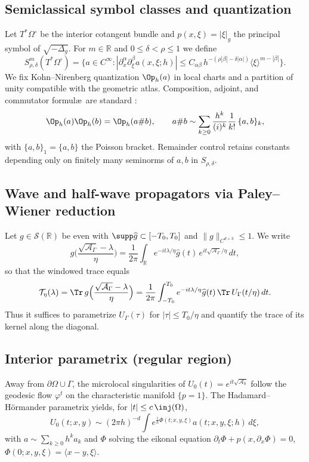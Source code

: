 \subsection{Semiclassical symbol classes and quantization}
\label{sec:symbol-classes}
Let $T^*\Omega^\circ$ be the interior cotangent bundle and $p(x,\xi)=|\xi|_g$ the principal symbol of $\sqrt{-\Delta_g}$.
For $m\in\mathbb{R}$ and $0\le \delta<\rho\le 1$ we define
\[
S^m_{\rho,\delta}(T^*\Omega^\circ) = \Big\{ a\in C^\infty : 
|\partial_x^\alpha\partial_\xi^\beta a(x,\xi;h)|
\le C_{\alpha\beta}\, h^{-(\rho|\beta|-\delta|\alpha|)} \langle \xi\rangle^{m-|\beta|}\Big\}.
\]
We fix Kohn--Nirenberg quantization $\Op_h(a)$ in local charts and a partition of unity compatible with the geometric atlas.
Composition, adjoint, and commutator formul\ae\ are standard \cite{DimassiSjostrand,Zworski}:
\[
\Op_h(a)\Op_h(b)=\Op_h(a\# b),\qquad 
a\# b \sim \sum_{k\ge 0} \frac{h^k}{(i)^k}\frac{1}{k!}\,\{a,b\}_k,
\]
with $\{a,b\}_1=\{a,b\}$ the Poisson bracket. Remainder control retains constants depending only on finitely many seminorms of $a,b$ in $S_{\rho,\delta}$.

\subsection{Wave and half-wave propagators via Paley--Wiener reduction}
Let $g\in \mathcal{S}(\mathbb{R})$ be even with $\supp\widehat{g}\subset[-T_0,T_0]$ and $\|g\|_{C^{d+3}}\le 1$.
We write
\[
g\Big(\frac{\sqrt{\mathcal{A}_\Gamma}-\lambda}{\eta}\Big)
= \frac{1}{2\pi}\int_{\mathbb{R}} e^{-it\lambda/\eta}\widehat{g}(t)\, e^{it \sqrt{\mathcal{A}_\Gamma}/\eta}\,dt,
\]
so that the windowed trace equals
\[
\mathcal{T}_\eta(\lambda)= \Tr \,g\Big(\frac{\sqrt{\mathcal{A}_\Gamma}-\lambda}{\eta}\Big)
= \frac{1}{2\pi}\int_{-T_0}^{T_0} e^{-it\lambda/\eta}\widehat{g}(t)\,\Tr\, U_\Gamma(t/\eta)\,dt.
\]
Thus it suffices to parametrize $U_\Gamma(\tau)$ for $|\tau|\le T_0/\eta$ and quantify the trace of its kernel along the diagonal.

\subsection{Interior parametrix (regular region)}
\label{subsec:interior-parametrix}
Away from $\partial\Omega\cup\Gamma$, the microlocal singularities of $U_0(t)=e^{it\sqrt{\mathcal{A}_0}}$ follow the geodesic flow $\varphi^t$ on the characteristic manifold $\{p=1\}$. The Hadamard--Hörmander parametrix \cite{Hormander,Zworski} yields, for $|t|\le c\,\inj(\Omega)$,
\[
U_0(t;x,y) \sim (2\pi h)^{-d}\!\!\!\!\int e^{\frac{i}{h}\Phi(t;x,y,\xi)} a(t;x,y,\xi;h)\,d\xi,
\]
with $a\sim \sum_{k\ge 0} h^k a_k$ and $\Phi$ solving the eikonal equation $\partial_t \Phi + p(x,\partial_x \Phi)=0$, $\Phi(0;x,y,\xi)=\langle x-y,\xi\rangle$.

